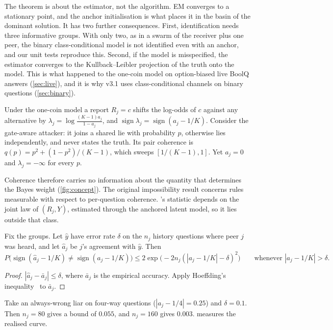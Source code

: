 The theorem is about the estimator, not the algorithm. EM converges to a stationary point, and the anchor initialisation is what places it in the basin of the dominant solution. It has two further consequences. First, identification needs three informative groups. With only two, as in a swarm of the receiver plus one peer, the binary class-conditional model is not identified even with an anchor, and our unit tests reproduce this. Second, if the model is misspecified, the estimator converges to the Kullback--Leibler projection of the truth onto the model. This is what happened to the one-coin model on option-biased live BoolQ answers (\cref{sec:live}), and it is why v3.1 uses class-conditional channels on binary questions (\cref{sec:binary}).

\begin{proposition}\label{prop:quantisation}
Under the one-coin model a report $R_j=c$ shifts the log-odds of $c$ against any alternative by $\lambda_j=\log\frac{(K-1)a_j}{1-a_j}$, and $\operatorname{sign}\lambda_j=\operatorname{sign}(a_j-1/K)$. Consider the gate-aware attacker: it joins a shared lie with probability $p$, otherwise lies independently, and never states the truth. Its pair coherence is $q(p)=p^2+(1-p^2)/(K-1)$, which sweeps $[1/(K-1),1]$. Yet $a_j=0$ and $\lambda_j=-\infty$ for every $p$.
\end{proposition}
Coherence therefore carries no information about the quantity that determines the Bayes weight (\cref{fig:concept}). The original impossibility result concerns rules measurable with respect to per-question coherence. \race's statistic depends on the joint law of $(R_j,Y)$, estimated through the anchored latent model, so it lies outside that class.

\begin{proposition}\label{prop:history}
Fix the groups. Let $\hat y$ have error rate $\delta$ on the $n_j$ history questions where peer $j$ was heard, and let $\hat a_j$ be $j$'s agreement with $\hat y$. Then
\[
P\bigl(\operatorname{sign}(\hat a_j-1/K)\neq\operatorname{sign}(a_j-1/K)\bigr)\le 2\exp\!\bigl(-2n_j(|a_j-1/K|-\delta)^2\bigr)
\qquad\text{whenever }|a_j-1/K|>\delta.
\]
\end{proposition}
\begin{proof}
$|\hat a_j-\bar a_j|\le\delta$, where $\bar a_j$ is the empirical accuracy. Apply Hoeffding's inequality~\citep{hoeffding1963} to $\bar a_j$.
\end{proof}
Take an always-wrong liar on four-way questions ($|a_j-1/4|=0.25$) and $\delta=0.1$. Then $n_j=80$ gives a bound of $0.055$, and $n_j=160$ gives $0.003$.  measures the realised curve.

